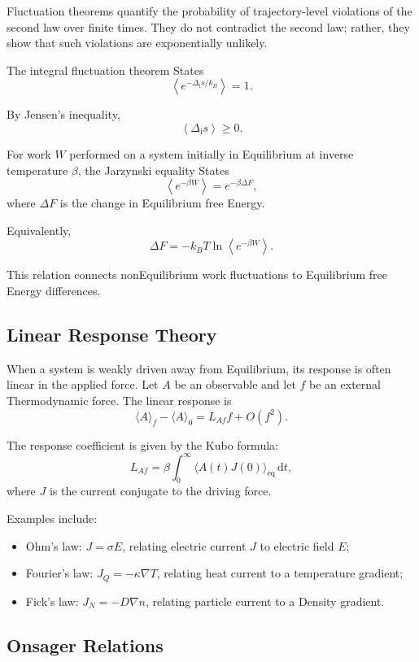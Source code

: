 \documentclass[a4paper, 10pt, onepage]{elegantbook}
\begin{document}
{Fluctuation theorems quantify the probability of trajectory-level violations of
the second law over finite times. They do not contradict the second law; rather,
they show that such violations are exponentially unlikely.

The integral fluctuation theorem States
\[
\left\langle e^{-\Delta_{\mathrm i}s/k_B}\right\rangle=1.
\]

By Jensen's inequality,
\[
\left\langle\Delta_{\mathrm i}s\right\rangle\ge0.
\]

For work \(W\) performed on a system initially in Equilibrium at inverse
temperature \(\beta\), the Jarzynski equality States
\[
\left\langle e^{-\beta W}\right\rangle
=
e^{-\beta\Delta F},
\]
where \(\Delta F\) is the change in Equilibrium free Energy.

Equivalently,
\[
\Delta F
=
-k_BT\ln
\left\langle e^{-\beta W}\right\rangle.
\]

This relation connects nonEquilibrium work fluctuations to Equilibrium free
Energy differences.

\subsection{Linear Response Theory}

When a system is weakly driven away from Equilibrium, its response is often
linear in the applied force. Let \(A\) be an observable and let \(f\) be an
external Thermodynamic force. The linear response is
\[
\langle A\rangle_f-\langle A\rangle_0
=
L_{Af}f+O(f^2).
\]

The response coefficient is given by the Kubo formula:
\[
L_{Af}
=
\beta
\int_0^\infty
\langle A(t)J(0)\rangle_{\mathrm{eq}}\,\mathrm dt,
\]
where \(J\) is the current conjugate to the driving force.

Examples include:

\begin{itemize}
\item Ohm's law: \(J=\sigma E\), relating electric current \(J\) to electric
field \(E\);
\item Fourier's law: \(J_Q=-\kappa\nabla T\), relating heat current to a
temperature gradient;
\item Fick's law: \(J_N=-D\nabla n\), relating particle current to a Density
gradient.
\end{itemize}

\subsection{Onsager Relations}

}
\end{document}
